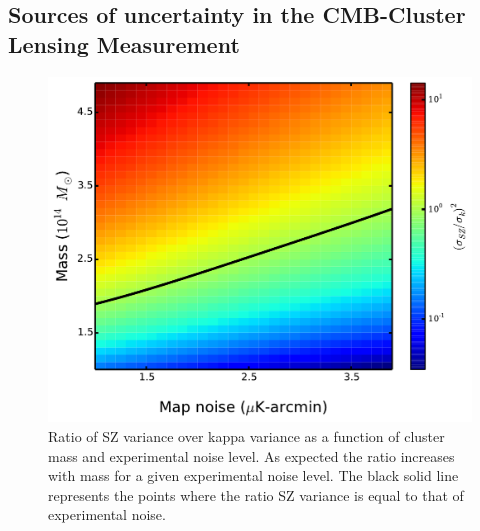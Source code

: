 {\subsection{Sources of uncertainty in the CMB-Cluster Lensing Measurement}
\begin{figure}[htb]
\includegraphics[width=\linewidth]{figs/contour_plot.pdf}
\vspace{-12pt}
 \caption{
 Ratio of SZ variance over kappa variance as a function of cluster mass and experimental noise level. 
 As expected the ratio increases with mass for a given experimental noise level. 
 The black solid line represents the points where the ratio SZ variance is equal to that of experimental noise.
  }
 \label{fig:variance}
\end{figure}

}

